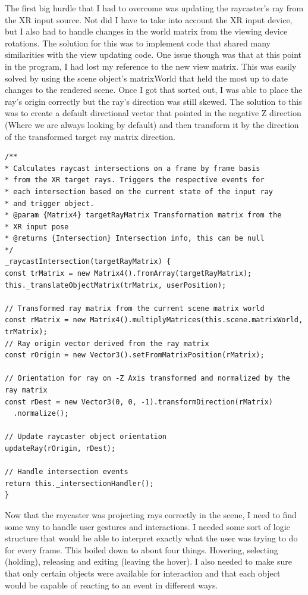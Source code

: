 \documentclass[onecolumn, draftclsnofoot,10pt, compsoc]{IEEEtran}
\begin{document}
    The first big hurdle that I had to overcome was updating the raycaster's ray from the XR input source. Not did I have to take into account the XR input device, but I also had to handle changes in the world matrix from the viewing device rotations. The solution for this was to implement code that shared many similarities with the view updating code. One issue though was that at this point in the program, I had lost my reference to the new view matrix. This was easily solved by using the scene object's matrixWorld that held the most up to date changes to the rendered scene. Once I got that sorted out, I was able to place the ray's origin correctly but the ray's direction was still skewed. The solution to this was to create a default directional vector that pointed in the negative Z direction (Where we are always looking by default) and then transform it by the direction of the transformed target ray matrix direction.
    \begin{lstlisting}
/**
* Calculates raycast intersections on a frame by frame basis
* from the XR target rays. Triggers the respective events for
* each intersection based on the current state of the input ray
* and trigger object.
* @param {Matrix4} targetRayMatrix Transformation matrix from the
* XR input pose
* @returns {Intersection} Intersection info, this can be null
*/
_raycastIntersection(targetRayMatrix) {
const trMatrix = new Matrix4().fromArray(targetRayMatrix);
this._translateObjectMatrix(trMatrix, userPosition);

// Transformed ray matrix from the current scene matrix world
const rMatrix = new Matrix4().multiplyMatrices(this.scene.matrixWorld, trMatrix);
// Ray origin vector derived from the ray matrix
const rOrigin = new Vector3().setFromMatrixPosition(rMatrix);

// Orientation for ray on -Z Axis transformed and normalized by the ray matrix
const rDest = new Vector3(0, 0, -1).transformDirection(rMatrix)
  .normalize();

// Update raycaster object orientation
updateRay(rOrigin, rDest);

// Handle intersection events
return this._intersectionHandler();
}
    \end{lstlisting}
    
    Now that the raycaster was projecting rays correctly in the scene, I need to find some way to handle user gestures and interactions. I needed some sort of logic structure that would be able to interpret exactly what the user was trying to do for every frame. This boiled down to about four things. Hovering, selecting (holding), releasing and exiting (leaving the hover). I also needed to make sure that only certain objects were available for interaction and that each object would be capable of reacting to an event in different ways.
    
\end{document}
